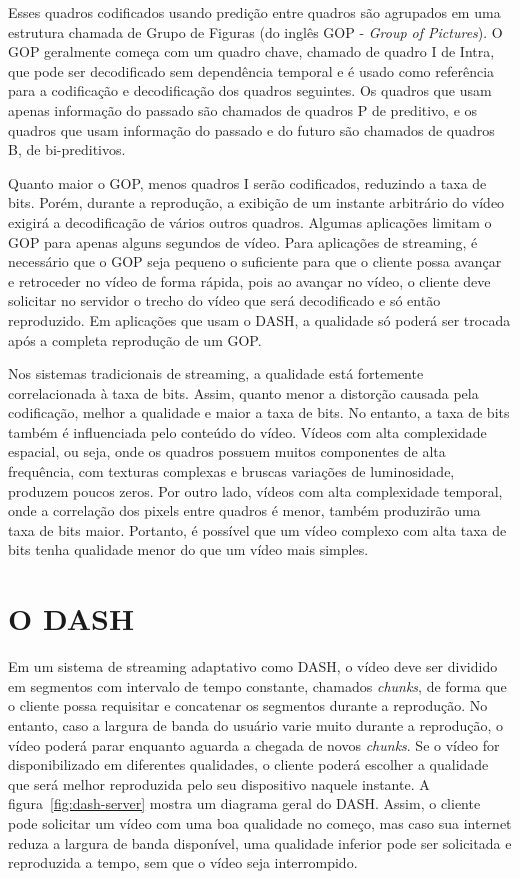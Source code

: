 Esses quadros codificados usando predição entre quadros são agrupados em uma estrutura chamada de Grupo de Figuras (do inglês GOP - \textit{Group of Pictures}). O GOP geralmente começa com um quadro chave, chamado de quadro I de Intra, que pode ser decodificado sem dependência temporal e é usado como referência para a codificação e decodificação dos quadros seguintes. Os quadros que usam apenas informação do passado são chamados de quadros P de preditivo, e os quadros que usam informação do passado e do futuro são chamados de quadros B, de bi-preditivos.

Quanto maior o GOP, menos quadros I serão codificados, reduzindo a taxa de bits. Porém, durante a reprodução, a exibição de um instante arbitrário do vídeo exigirá a decodificação de vários outros quadros. Algumas aplicações limitam o GOP para apenas alguns segundos de vídeo. Para aplicações de streaming, é necessário que o GOP seja pequeno o suficiente para que o cliente possa avançar e retroceder no vídeo de forma rápida, pois ao avançar no vídeo, o cliente deve solicitar no servidor o trecho do vídeo que será decodificado e só então reproduzido. Em aplicações que usam o DASH, a qualidade só poderá ser trocada após a completa reprodução de um GOP.

Nos sistemas tradicionais de streaming, a qualidade está fortemente correlacionada à taxa de bits. Assim, quanto menor a distorção causada pela codificação, melhor a qualidade e maior a taxa de bits. No entanto, a taxa de bits também é influenciada pelo conteúdo do vídeo. Vídeos com alta complexidade espacial, ou seja, onde os quadros possuem muitos componentes de alta frequência, com texturas complexas e bruscas variações de luminosidade, produzem poucos zeros. Por outro lado, vídeos com alta complexidade temporal, onde a correlação dos pixels entre quadros é menor, também produzirão uma taxa de bits maior. Portanto, é possível que um vídeo complexo com alta taxa de bits tenha qualidade menor do que um vídeo mais simples.


\section{O DASH}

Em um sistema de streaming adaptativo como DASH, o vídeo deve ser dividido em segmentos com intervalo de tempo constante, chamados \textit{chunks}, de forma que o cliente possa requisitar e concatenar os segmentos durante a reprodução. No entanto, caso a largura de banda do usuário varie muito durante a reprodução, o vídeo poderá parar enquanto aguarda a chegada de novos \textit{chunks}. Se o vídeo for disponibilizado em diferentes qualidades, o cliente poderá escolher a qualidade que será melhor reproduzida pelo seu dispositivo naquele instante. A figura~\ref{fig:dash-server} mostra um diagrama geral do DASH. Assim, o cliente pode solicitar um vídeo com uma boa qualidade no começo, mas caso sua internet reduza a largura de banda disponível, uma qualidade inferior pode ser solicitada e reproduzida a tempo, sem que o vídeo seja interrompido.

